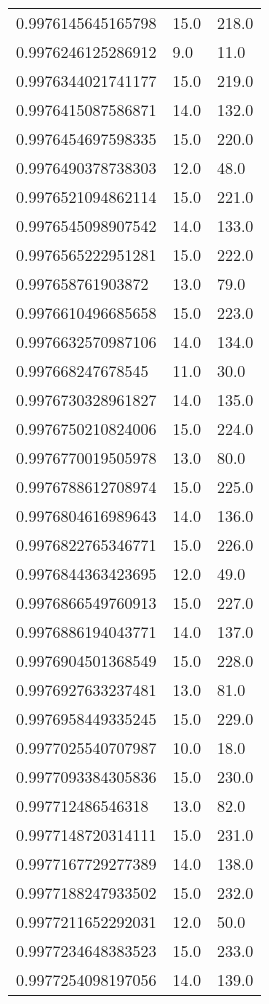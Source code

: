 \begin{center}
\begin{supertabular}[H]{p{0.30\textwidth}p{0.05\textwidth}p{0.05\textwidth}}
0.9976145645165798 & 15.0 & 218.0 \\ 
0.9976246125286912 & 9.0 & 11.0 \\ 
0.9976344021741177 & 15.0 & 219.0 \\ 
0.9976415087586871 & 14.0 & 132.0 \\ 
0.9976454697598335 & 15.0 & 220.0 \\ 
0.9976490378738303 & 12.0 & 48.0 \\ 
0.9976521094862114 & 15.0 & 221.0 \\ 
0.9976545098907542 & 14.0 & 133.0 \\ 
0.9976565222951281 & 15.0 & 222.0 \\ 
0.997658761903872 & 13.0 & 79.0 \\ 
0.9976610496685658 & 15.0 & 223.0 \\ 
0.9976632570987106 & 14.0 & 134.0 \\ 
0.997668247678545 & 11.0 & 30.0 \\ 
0.9976730328961827 & 14.0 & 135.0 \\ 
0.9976750210824006 & 15.0 & 224.0 \\ 
0.9976770019505978 & 13.0 & 80.0 \\ 
0.9976788612708974 & 15.0 & 225.0 \\ 
0.9976804616989643 & 14.0 & 136.0 \\ 
0.9976822765346771 & 15.0 & 226.0 \\ 
0.9976844363423695 & 12.0 & 49.0 \\ 
0.9976866549760913 & 15.0 & 227.0 \\ 
0.9976886194043771 & 14.0 & 137.0 \\ 
0.9976904501368549 & 15.0 & 228.0 \\ 
0.9976927633237481 & 13.0 & 81.0 \\ 
0.9976958449335245 & 15.0 & 229.0 \\ 
0.9977025540707987 & 10.0 & 18.0 \\ 
0.9977093384305836 & 15.0 & 230.0 \\ 
0.997712486546318 & 13.0 & 82.0 \\ 
0.9977148720314111 & 15.0 & 231.0 \\ 
0.9977167729277389 & 14.0 & 138.0 \\ 
0.9977188247933502 & 15.0 & 232.0 \\ 
0.9977211652292031 & 12.0 & 50.0 \\ 
0.9977234648383523 & 15.0 & 233.0 \\ 
0.9977254098197056 & 14.0 & 139.0 \\ 

\end{supertabular}
\end{center}
